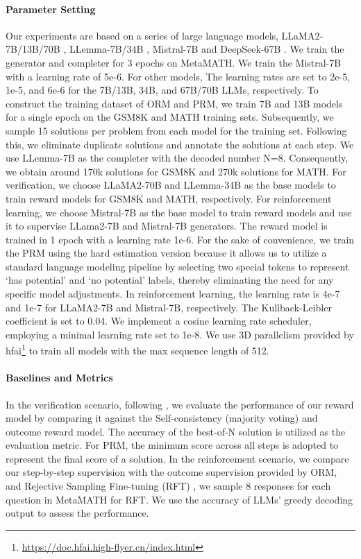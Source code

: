 \documentclass{article} %
\begin{document}
\paragraph{Parameter Setting}
\label{sec:param}
Our experiments are based on a series of large language models, LLaMA2-7B/13B/70B \citep{LLaMA}, LLemma-7B/34B \citep{azerbayev2023llemma}, Mistral-7B \citep{jiang2023mistral} and DeepSeek-67B \citep{DeepSeek-llm}. 
We train the generator and completer for 3 epochs on MetaMATH. 
We train the Mistral-7B with a learning rate of 5e-6. 
For other models, The learning rates are set to 2e-5, 1e-5, and 6e-6 for the 7B/13B, 34B, and 67B/70B LLMs, respectively.
To construct the training dataset of ORM and PRM, we train 7B and 13B models for a single epoch on the GSM8K and MATH training sets. Subsequently, we sample 15 solutions per problem from each model for the training set. Following this, we eliminate duplicate solutions and annotate the solutions at each step. 
We use LLemma-7B as the completer with the decoded number N=8.
Consequently, we obtain around 170k solutions for GSM8K and 270k solutions for MATH.
For verification,
we choose LLaMA2-70B and LLemma-34B as the base models to train reward models for GSM8K and MATH, respectively. 
For reinforcement learning, 
we choose Mistral-7B as the base model to train reward models and use it to supervise LLama2-7B and Mistral-7B generators.
The reward model is trained in 1 epoch with a learning rate 1e-6.
For the sake of convenience, we train the PRM using the hard estimation version because it allows us to utilize a standard language modeling pipeline by selecting two special tokens to represent `has potential' and `no potential' labels, thereby eliminating the need for any specific model adjustments.
In reinforcement learning, the learning rate is 4e-7 and 1e-7 for LLaMA2-7B and Mistral-7B, respectively.
The Kullback-Leibler coefficient is set to 0.04.
We implement a cosine learning rate scheduler, employing a minimal learning rate set to 1e-8. 
We use 3D parallelism provided by hfai\footnote{\url{https://doc.hfai.high-flyer.cn/index.html}} to train all models with the max sequence length of 512. 

\paragraph{Baselines and Metrics}
In the verification scenario, following \citep{lightman2023let}, we evaluate the performance of our reward model by comparing it against the Self-consistency (majority voting) and outcome reward model. The accuracy of the best-of-N solution is utilized as the evaluation metric.
For PRM, the minimum score across all steps is adopted to represent the final score of a solution. 
In the reinforcement scenario, we compare our step-by-step supervision with the outcome supervision provided by ORM, and Rejective Sampling Fine-tuning (RFT) \citep{yuan2023scaling}, we sample 8 responses for each question in MetaMATH for RFT.
We use the accuracy of LLMs' greedy decoding output to assess the performance.
\end{document}
